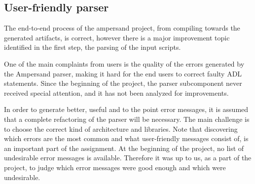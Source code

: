 
\subsection{User-friendly parser}
The end-to-end process of the ampersand project, from compiling towards the generated artifacts, is correct, however there is a major improvement topic identified in the first step, the parsing of the input scripts.

One of the main complaints from users is the quality of the errors generated by the Ampersand parser, making it hard for the end users to correct faulty ADL statements.
Since the beginning of the project, the parser subcomponent never received special attention, and it has not been analyzed for improvements.

In order to generate better, useful and to the point error messages, it is assumed that a complete refactoring of the parser will be necessary.
The main challenge is to choose the correct kind of architecture and libraries.
Note that discovering which errors are the most common and what user-friendly messages consist of, is an important part of the assignment.
At the beginning of the project, no list of undesirable error messages is available.
Therefore it was up to us, as a part of the project, to judge which error messages were good enough and which were undesirable.
